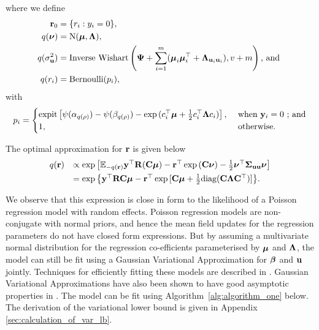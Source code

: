 \noindent where we define 
\begin{align*}
    {\bf r}_0 &= \{ r_i : y_i = 0 \}, \\
    q({\boldsymbol \nu}) &= \text{N}({\boldsymbol \mu}, {\boldsymbol \Lambda}), \\ 
    q(\sigma_{{\bf u}}^2) &= \text{Inverse Wishart}\left({\boldsymbol \Psi} + \sum_{i=1}^m ({\boldsymbol \mu}_i {\boldsymbol \mu}_i^\top + {\boldsymbol \Lambda}_{{\bf u}_i {\bf u}_i}), v + m \right) \mbox{, and } \\ 
    q(r_i) &= \text{Bernoulli}{(p_i)},
\end{align*}
with
$$p_i = 
\begin{cases}
    \text{expit}\left[ \psi{(\alpha_{q(\rho)})} - \psi{(\beta_{q(\rho)})} - \exp{(c_i^\top{\boldsymbol\mu}+ \frac{1}{2} c_i^\top {\boldsymbol\Lambda}c_i)} \right],& \text{ when } {\bf y}_i = 0\text{ ; and}\\
1,& \text{ otherwise.}
\end{cases}$$


The optimal approximation for ${\bf r}$ is given below %
\begin{equation}
\label{eq:optimal_approximation}
\begin{array}{rl}
    q({\bf r}) & \propto \exp \left[ {\mathbb E}_{-q({\bf r})}{\bf y}^\top{\bf R}({\bf C}{\boldsymbol \mu}) - {\bf r}^\top\exp{({\bf C}{\boldsymbol\nu})}-\frac{1}{2} {\boldsymbol \nu}^\top {\boldsymbol\Sigma}_{{\bf u} {\bf u}} {\boldsymbol \nu} \right] \\ [1ex]
           & = \exp{ \left\{ {\bf y}^\top{\bf R}{\bf C}{\boldsymbol\mu}- {\bf r}^\top \exp{[{\bf C}{\boldsymbol\mu}+ \frac{1}{2} \text{diag}({\bf C}{\boldsymbol\Lambda}{\bf C}^\top)]} \right\} }.
\end{array}
\end{equation}

We observe that this expression is close in form to the likelihood of a Poisson
regression model with random effects. Poisson regression models are
non-conjugate with normal priors, and hence the mean field updates for the
regression parameters do not have closed form expressions. But by assuming a
multivariate normal distribution for the regression co-efficients parameterised
by ${\boldsymbol \mu}$ and ${\boldsymbol \Lambda}$, the model can still be fit using a Gaussian
Variational Approximation for ${\boldsymbol \beta}$ and ${\bf u}$ jointly. Techniques for
efficiently fitting these models are described in \cite{Ormerod2012,
Challis2013, Opper2009}. Gaussian Variational Approximations have also been
shown to have good asymptotic properties in \cite{Sinica2017}. The model can be
fit using Algorithm~\ref{alg:algorithm_one} below. The derivation of the
variational lower bound is given in Appendix \ref{sec:calculation_of_var_lb}.

